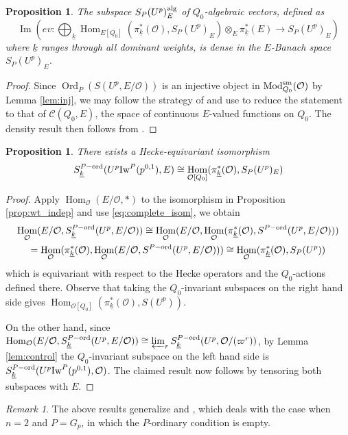 \documentclass[leqno]{amsart}
\newtheorem{prop}[thm]{Proposition}
\theoremstyle{definition}
\theoremstyle{remark}
\newtheorem{rem}[thm]{Remark}
\newcommand{\oo}{\mathcal{O}}
\DeclareMathOperator{\Hom}{Hom}
\DeclareMathOperator{\Image}{Im}
\DeclareMathOperator{\Mod}{\textnormal{Mod}}
\DeclareMathOperator{\Ord}{Ord} %
\newcommand{\sm}{\textnormal{sm}}
\newcommand{\wt}[1]{\underline{ #1 }}
\newcommand{\Iw}{\textnormal{Iw}} %
\newcommand{\ord}{\textnormal{ord}} %
\begin{document}
\begin{prop}\label{prop:density}
The subspace $S_P(U^p)_E^{\textnormal{alg}}$ 
of $Q_0$-algebraic vectors, defined as
\[
\Image\left(ev\colon
\bigoplus_{\wt{k}}\Hom_{E[Q_0]}(\pi_{\wt{k}}^*(\oo), S_P(U^p)_E)
\otimes_E \pi_{\wt{k}}^*(E)\rightarrow S_P(U^p)_E\right)
\]
where $\wt{k}$ ranges through all dominant weights,
is dense in the $E$-Banach space $S_P(U^p)_E$.
\end{prop}
\begin{proof}
	Since $\Ord_P(S(U^p,E/\oo))$ is an injective object
	in $\Mod_{Q_0}^{\sm}(\oo)$
	by Lemma \ref{lem:inj},
	we may follow the strategy of 
	\cite[Prop 3.2.9]{pan}
	and use \cite[Cor 3.2.6]{pan}
	to reduce the statement to that of
	$\mathcal{C}(Q_0,E)$,
	the space of continuous  $E$-valued
	functions on $Q_0$.
	The density result then follows from
	\cite[Prop 6.A.17]{Pask14}.
\end{proof}


\begin{prop}\label{prop:wt_space}
	There exists a Hecke-equivariant isomorphism
	\[
	S_{\wt{k}}^{P-\ord}(U^p\Iw^P(p^{0,1}),E)\cong 
	\Hom_{\oo[Q_0]}(\pi_{\wt{k}}^*(\oo), S_P(U^p)_E)
	\]
\end{prop}
\begin{proof}
    Apply $\Hom_\oo(E/\oo,*)$ to the isomorphism 
    in Proposition \ref{prop:wt_indep}
    and use \eqref{eq:complete_isom}, we obtain 
	\begin{multline*}
		\Hom_\oo(E/\oo, S_{\wt{k}}^{P-\ord}(U^p,E/\oo))\cong 
		\Hom_\oo(E/\oo,
		\Hom_{\oo}(\pi_{\wt{k}}^*(\oo),
		S^{P-\ord}(U^p,E/\oo)))\\=
		\Hom_{\oo}(\pi_{\wt{k}}^*(\oo),
		\Hom_\oo(E/\oo,
		S^{P-\ord}(U^p,E/\oo)))\cong
		\Hom_{\oo}(\pi_{\wt{k}}^*(\oo), S_P(U^p))
	\end{multline*}
	which is equivariant with respect to 
	the Hecke operators and the $Q_0$-actions defined there.
    Observe that 
	taking the $Q_0$-invariant subspaces
	on the right hand side gives
	$\Hom_{\oo[Q_0]}(\pi_{\wt{k}}^*(\oo), S(U^p))$.

	On the other hand, since
	$\Hom_\oo(E/\oo, S_{\wt{k}}^{P-\ord}(U^p,E/\oo))\cong
	\varprojlim_r S_{\wt{k}}^{P-\ord}(U^p,\oo/(\varpi^r))$,
	by Lemma \ref{lem:control}
	the $Q_0$-invariant subspace 
	on the left hand side
	is $S_{\wt{k}}^{P-\ord}(U^p\Iw^P(p^{0,1}),\oo)$.
	The claimed result now follows by
	tensoring both subspaces with $E$.
\end{proof}

\begin{rem}
	The above results generalize
	\cite[Prop 3.2.9]{pan} and 
	\cite[\S 3.2.10]{pan},
	which deals with the case 
	when $n=2$ and $P=G_p$,
	in which the $P$-ordinary condition is empty.
\end{rem}
\end{document}
